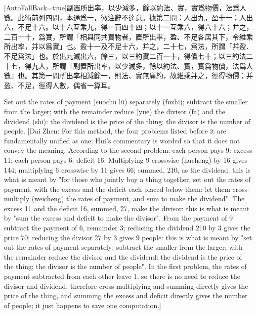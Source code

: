 \documentclass[11pt]{article}
\newcommand{\zhsmall}{\footnotesize\color{black!70}}
\newcommand{\unitlabel}[1]{\marginpar{\raggedleft\tiny\color{gray}#1}}
\newenvironment{unitzh}{\par\CJKfontspec{Noto Serif CJK SC}[AutoFallBack=true]\large\linespread{1.25}\selectfont}{\par}
\newenvironment{uniten}{\par\small\color{black!85}}{\par\medskip}
\begin{document}
\begin{unitzh}\unitlabel{jiuzhang-032.7}副置所出率，以少減多，餘以約法、實，實爲物價，法爲人數。{\zhsmall 此術前列四問，本通爲一，徽注辭不達意。據第二問：人出九，盈十一；人出六，不足十六。以十六互乘九，得一百四十四；以十一互乘六，得六十六；并之，二百一十，爲實，所謂「相與同共買物者，置所出率，盈、不足各居其下，令維乘所出率，并以爲實」也。盈十一及不足十六，并之，二十七，爲法，所謂「幷盈、不足爲法」也。於出九減出六，餘三，以三約實二百一十，得價七十；以三約法二十七，得九人，所謂「副置所出率，以少減多，餘以約法、實，實爲物價，法爲人數」也。其第一問所出率相減餘一，則法、實無庸約，故維乘并之，徑得物價；并盈、不足，徑得人數，偶省一算耳。}\end{unitzh}
\begin{uniten}Set out the rates of payment (suochu lü) separately (fuzhi); subtract the smaller from the larger; with the remainder reduce (yue) the divisor (fa) and the dividend (shi): the dividend is the price of the thing; the divisor is the number of people. [Dai Zhen: For this method, the four problems listed before it are fundamentally unified as one; Hui's commentary is worded so that it does not convey the meaning. According to the second problem: each person pays 9: excess 11; each person pays 6: deficit 16. Multiplying 9 crosswise (hucheng) by 16 gives 144; multiplying 6 crosswise by 11 gives 66; summed, 210, as the dividend: this is what is meant by "for those who jointly buy a thing together, set out the rates of payment, with the excess and the deficit each placed below them; let them cross-multiply (weicheng) the rates of payment, and sum to make the dividend". The excess 11 and the deficit 16, summed, 27, make the divisor: this is what is meant by "sum the excess and deficit to make the divisor". From the payment of 9 subtract the payment of 6, remainder 3; reducing the dividend 210 by 3 gives the price 70; reducing the divisor 27 by 3 gives 9 people: this is what is meant by "set out the rates of payment separately; subtract the smaller from the larger; with the remainder reduce the divisor and the dividend: the dividend is the price of the thing; the divisor is the number of people". In the first problem, the rates of payment subtracted from each other leave 1, so there is no need to reduce the divisor and dividend; therefore cross-multiplying and summing directly gives the price of the thing, and summing the excess and deficit directly gives the number of people; it just happens to save one computation.]\end{uniten}
\end{document}
